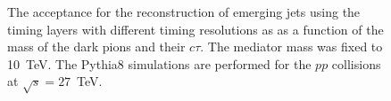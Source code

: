 \begin{figure}
\begin{center}

\end{center}
\caption{
The acceptance for the reconstruction of emerging jets using the timing layers with different timing resolutions as
as a function of the mass of the dark pions and their $c\tau$. The mediator mass was fixed to 10~TeV. The Pythia8 simulations are performed 
for the $pp$ collisions at $\sqrt{s}=27$~TeV. 
}
\label{fig:efficiency}
\end{figure}


